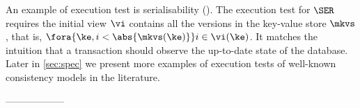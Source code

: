 An example of execution test is serialisability (\SER).
The execution test for \( \SER \) requires the initial view  \( \vi \) contains all the versions in the key-value store \( \mkvs \), that is, \( \fora{\ke, i < \abs{\mkvs(\ke)} } i \in \vi(\ke)\).
It matches the intuition that a transaction should observe the up-to-date state of the database.
Later in \cref{sec:spec} we present more examples of execution tests of well-known consistency models in the literature. 
 


------------------

%
%
